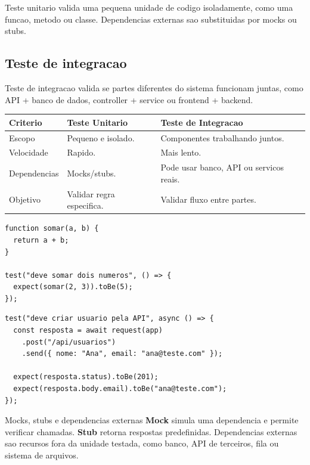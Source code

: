 \documentclass[12pt,a4paper]{article}
\begin{document}
Teste unitario valida uma pequena unidade de codigo isoladamente, como uma funcao, metodo ou classe. Dependencias externas sao substituidas por mocks ou stubs.

\subsection{Teste de integracao}

Teste de integracao valida se partes diferentes do sistema funcionam juntas, como API + banco de dados, controller + service ou frontend + backend.

\begin{tabularx}{\textwidth}{@{}L{3.5cm}Y Y@{}}
\toprule
\textbf{Criterio} & \textbf{Teste Unitario} & \textbf{Teste de Integracao} \\
\midrule
Escopo & Pequeno e isolado. & Componentes trabalhando juntos. \\
Velocidade & Rapido. & Mais lento. \\
Dependencias & Mocks/stubs. & Pode usar banco, API ou servicos reais. \\
Objetivo & Validar regra especifica. & Validar fluxo entre partes. \\
\bottomrule
\end{tabularx}

\begin{lstlisting}[caption={Exemplo de teste unitario em JavaScript}]
function somar(a, b) {
  return a + b;
}

test("deve somar dois numeros", () => {
  expect(somar(2, 3)).toBe(5);
});
\end{lstlisting}

\begin{lstlisting}[caption={Exemplo conceitual de teste de integracao}]
test("deve criar usuario pela API", async () => {
  const resposta = await request(app)
    .post("/api/usuarios")
    .send({ nome: "Ana", email: "ana@teste.com" });

  expect(resposta.status).toBe(201);
  expect(resposta.body.email).toBe("ana@teste.com");
});
\end{lstlisting}

\begin{conceito}{Mocks, stubs e dependencias externas}
\textbf{Mock} simula uma dependencia e permite verificar chamadas. \textbf{Stub} retorna respostas predefinidas. Dependencias externas sao recursos fora da unidade testada, como banco, API de terceiros, fila ou sistema de arquivos.
\end{conceito}
\end{document}
